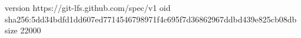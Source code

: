 version https://git-lfs.github.com/spec/v1
oid sha256:5dd34bdfd1dd607ed7714546798971f4c695f7d36862967ddbd439e825cb08db
size 22000
